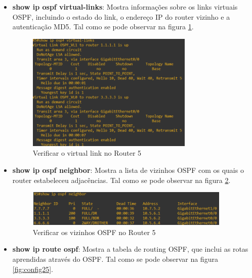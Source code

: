 \documentclass[11pt,english, openright, oneside]{book}
\begin{document}
\begin{itemize}
  \item \textbf{show ip ospf virtual-links}: Mostra informações sobre os links virtuais OSPF, incluindo o estado do link, o endereço IP do router vizinho e a autenticação MD5. Tal como se pode observar na figura \ref{fig:config23}.
  \vspace{0.2cm}

  \begin{figure}[H]
    \centering
    \includegraphics[width=0.75\textwidth]{imagens/Tarefa3/15.virtual_link_test_R5.png}
    \caption{Verificar o virtual link no Router 5}
    \label{fig:config23}
  \end{figure}
  \vspace{0.2cm}

  \item \textbf{show ip ospf neighbor}: Mostra a lista de vizinhos OSPF com os quais o router estabeleceu adjacências. Tal como se pode observar na figura \ref{fig:config24}.
  \vspace{0.2cm}

  \begin{figure}[H]
    \centering
    \includegraphics[width=0.92\textwidth]{imagens/Tarefa3/15.ospf_neigh_R5.png}
    \caption{Verificar os vizinhos OSPF no Router 5}
    \label{fig:config24}
  \end{figure}
  \vspace{0.2cm}

  \item \textbf{show ip route ospf}: Mostra a tabela de routing OSPF, que inclui as rotas aprendidas através do OSPF. Tal como se pode observar na figura \ref{fig:config25}.
  \vspace{0.2cm}


\end{itemize}
\end{document}
